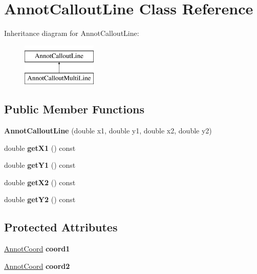 \hypertarget{class_annot_callout_line}{}\section{Annot\+Callout\+Line Class Reference}
\label{class_annot_callout_line}
Inheritance diagram for Annot\+Callout\+Line\+:\begin{figure}[H]
\begin{center}
\leavevmode
\includegraphics[height=2.000000cm]{class_annot_callout_line}
\end{center}
\end{figure}
\subsection*{Public Member Functions}
\begin{DoxyCompactItemize}
\item 
\mbox{\label{class_annot_callout_line_a10c04fd3257a24d16e97f0af73f67df5}} 
{\bfseries Annot\+Callout\+Line} (double x1, double y1, double x2, double y2)
\item 
\mbox{\label{class_annot_callout_line_a33467bc461a943c074a36020396809e7}} 
double {\bfseries get\+X1} () const
\item 
\mbox{\label{class_annot_callout_line_a4907b7d60e64f7fc9cf8aa46f168c0ba}} 
double {\bfseries get\+Y1} () const
\item 
\mbox{\label{class_annot_callout_line_a3561ca53696d956a6c91890a0f8457c3}} 
double {\bfseries get\+X2} () const
\item 
\mbox{\label{class_annot_callout_line_a93ffea07cb38e0ac834f3241c39d8ae9}} 
double {\bfseries get\+Y2} () const
\end{DoxyCompactItemize}
\subsection*{Protected Attributes}
\begin{DoxyCompactItemize}
\item 
\mbox{\label{class_annot_callout_line_aa53370be8612966fb014d147f0d957ff}} 
\hyperlink{class_annot_coord}{Annot\+Coord} {\bfseries coord1}
\item 
\mbox{\label{class_annot_callout_line_a3e9aa8fef60e6ad32553fbb95cab3fb1}} 
\hyperlink{class_annot_coord}{Annot\+Coord} {\bfseries coord2}
\end{DoxyCompactItemize}


